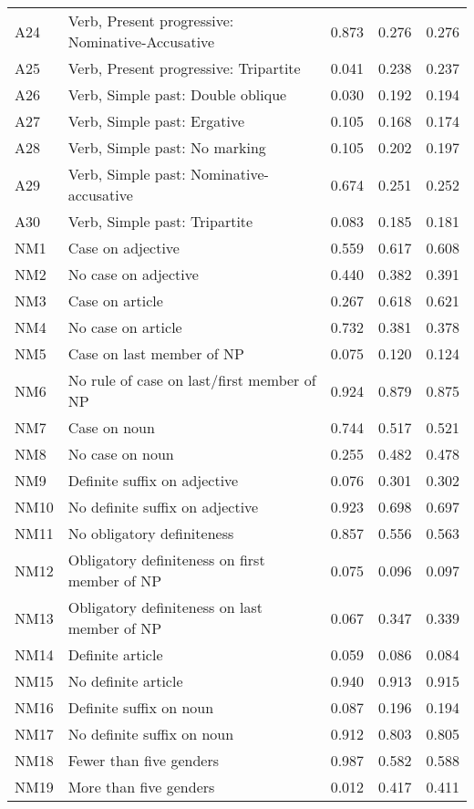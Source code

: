 \begin{longtable}{lllll}
A24 & Verb, Present progressive: Nominative-Accusative & 0.873 & 0.276 & 0.276\\
A25 & Verb, Present progressive: Tripartite & 0.041 & 0.238 & 0.237\\
A26 & Verb, Simple past: Double oblique & 0.030 & 0.192 & 0.194\\
A27 & Verb, Simple past: Ergative & 0.105 & 0.168 & 0.174\\
A28 & Verb, Simple past: No marking & 0.105 & 0.202 & 0.197\\
A29 & Verb, Simple past: Nominative-accusative & 0.674 & 0.251 & 0.252\\
A30 & Verb, Simple past: Tripartite & 0.083 & 0.185 & 0.181\\
NM1 & Case on adjective & 0.559 & 0.617 & 0.608\\
NM2 & No case on adjective & 0.440 & 0.382 & 0.391\\
NM3 & Case on article & 0.267 & 0.618 & 0.621\\
NM4 & No case on article & 0.732 & 0.381 & 0.378\\
NM5 & Case on last member of NP & 0.075 & 0.120 & 0.124\\
NM6 & No rule of case on last/first member of NP & 0.924 & 0.879 & 0.875\\
NM7 & Case on noun & 0.744 & 0.517 & 0.521\\
NM8 & No case on noun & 0.255 & 0.482 & 0.478\\
NM9 & Definite suffix on adjective & 0.076 & 0.301 & 0.302\\
NM10 & No definite suffix on adjective & 0.923 & 0.698 & 0.697\\
NM11 & No obligatory definiteness & 0.857 & 0.556 & 0.563\\
NM12 & Obligatory definiteness on first member of NP & 0.075 & 0.096 & 0.097\\
NM13 & Obligatory definiteness on last member of NP & 0.067 & 0.347 & 0.339\\
NM14 & Definite article & 0.059 & 0.086 & 0.084\\
NM15 & No definite article & 0.940 & 0.913 & 0.915\\
NM16 & Definite suffix on noun & 0.087 & 0.196 & 0.194\\
NM17 & No definite suffix on noun & 0.912 & 0.803 & 0.805\\
NM18 & Fewer than five genders & 0.987 & 0.582 & 0.588\\
NM19 & More than five genders & 0.012 & 0.417 & 0.411\\

\end{longtable}
